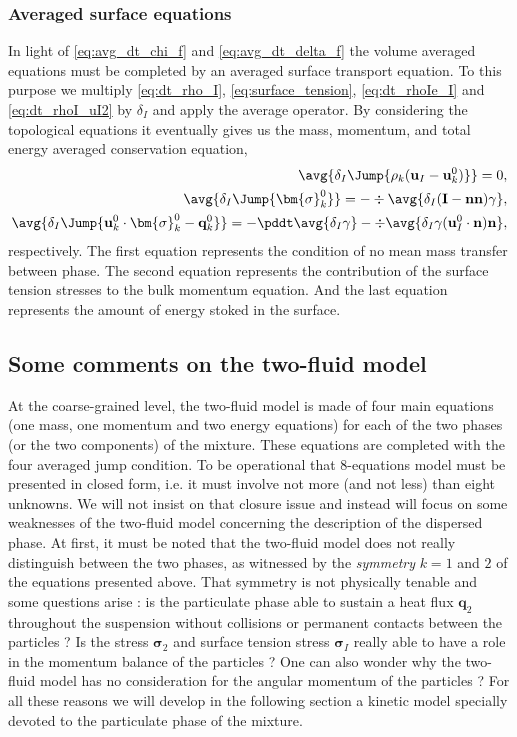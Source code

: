 \subsubsection{Averaged surface equations}
In light of \ref{eq:avg_dt_chi_f} and \ref{eq:avg_dt_delta_f} the volume averaged equations must be completed by an averaged surface transport equation.  
To this purpose we multiply \ref{eq:dt_rho_I}, \ref{eq:surface_tension}, \ref{eq:dt_rhoIe_I} and \ref{eq:dt_rhoI_uI2} by $\delta_I$ and apply the average operator.
By considering the topological equations it eventually gives us the mass, momentum, and total energy averaged conservation equation, 
\begin{align}
    \label{eq:dt_avg_rho_I}
    \avg{\delta_I \Jump{\rho_k (\textbf{u}_I - \textbf{u}_k^0)}}
    = 0,\\
    \label{eq:dt_avg_uI}
    \avg{\delta_I \Jump{\bm{\sigma}^0_k}}
    = - \div \avg{\delta_I (\textbf{I} - \textbf{nn}) \gamma},\\
    \label{eq:dt_avg_gamma}
    \avg{\delta_I \Jump{\textbf{u}_k^0 \cdot \bm{\sigma}^0_k - \textbf{q}^0_k}}
    = - \pddt \avg{\delta_I \gamma}
    - \div \avg{\delta_I \gamma (\textbf{u}_{I}^0 \cdot \textbf{n})\textbf{n} },
\end{align}
respectively. 
The first equation represents the condition of no mean mass transfer between phase.
The second equation represents the contribution of the surface tension stresses to the bulk momentum equation.
And the last equation represents the amount of energy stoked in the surface. 

\subsection{Some comments on the two-fluid model}

At the coarse-grained level, the two-fluid model is made of four main equations
(one mass, one momentum and two energy equations) for each of the two phases
(or the two components) of the mixture. 
These equations are completed with the four averaged jump condition.  
To be operational that 8-equations
model must be presented in closed form, i.e. it must involve not more (and
not less) than eight unknowns. 
We will not insist on that closure issue and
instead will focus on some weaknesses of the two-fluid model concerning the
description of the dispersed phase. 
At first, it must be noted that the two-fluid model does not really distinguish between the two phases, as witnessed by the
\textit{symmetry} $k = 1$ and $2$ of the equations presented above. That symmetry
is not physically tenable and some questions arise : is the particulate phase
able to sustain a heat flux $\textbf{q}_2$ throughout the suspension without collisions or permanent contacts between the particles ? Is the stress $\bm{\sigma}_2$ and surface tension stress $\bm{\sigma}_I$ really able to have a role in the momentum balance of the particles ? 
One can also wonder why the two-fluid model has no consideration for the angular momentum of the particles ? 
For all these reasons we will develop in the following section a kinetic model
specially devoted to the particulate phase of the mixture.
